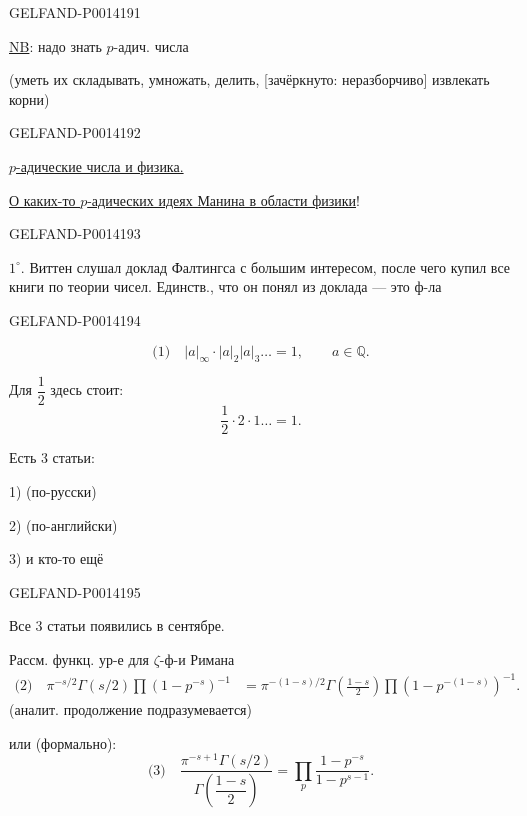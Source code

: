 \begin{GelfandAdjacentEvidence}{GELFAND-P001419}{1}


\uline{NB}: надо знать \(p\)-адич. числа

(уметь их складывать, умножать, делить, [зачёркнуто: неразборчиво] извлекать корни)
\end{GelfandAdjacentEvidence}
\begin{GelfandAdjacentEvidence}{GELFAND-P001419}{2}


\qquad \uline{\(p\)-адические числа и физика.}

\uline{О каких-то \(p\)-адических идеях Манина в области физики}!
\end{GelfandAdjacentEvidence}
\begin{GelfandAdjacentEvidence}{GELFAND-P001419}{3}


\(1^{\circ}\). Виттен слушал доклад Фалтингса с большим интересом, после чего купил все книги по теории чисел.
Единств., что он понял из доклада — это ф-ла
\end{GelfandAdjacentEvidence}
\begin{GelfandAdjacentEvidence}{GELFAND-P001419}{4}

\[
\text{(1)}\quad |a|_\infty\cdot|a|_2|a|_3\ldots=1,\qquad a\in\mathbb Q.
\]

Для \(\dfrac12\) здесь стоит:
\[
\frac12\cdot 2\cdot 1\ldots=1.
\]

Есть 3 статьи:

1) \qquad (по-русски)

2) \qquad (по-английски)

3)  и кто-то ещё
\end{GelfandAdjacentEvidence}
\begin{GelfandAdjacentEvidence}{GELFAND-P001419}{5}


Все 3 статьи появились в сентябре.


Рассм. функц. ур-е для \(\zeta\)-ф-и Римана
\[
\begin{aligned}
\text{(2)}\quad\pi^{-s/2}\Gamma(s/2)\prod(1-p^{-s})^{-1}
&=\pi^{-(1-s)/2}\Gamma\left(\frac{1-s}{2}\right)
\prod(1-p^{-(1-s)})^{-1}.
\end{aligned}
\]
(аналит. продолжение подразумевается)

или (формально):
\[
\text{(3)}\quad
\frac{\pi^{-s+1}\Gamma(s/2)}{\Gamma\left(\dfrac{1-s}{2}\right)}
=\prod_p\frac{1-p^{-s}}{1-p^{s-1}}.
\]
\end{GelfandAdjacentEvidence}


